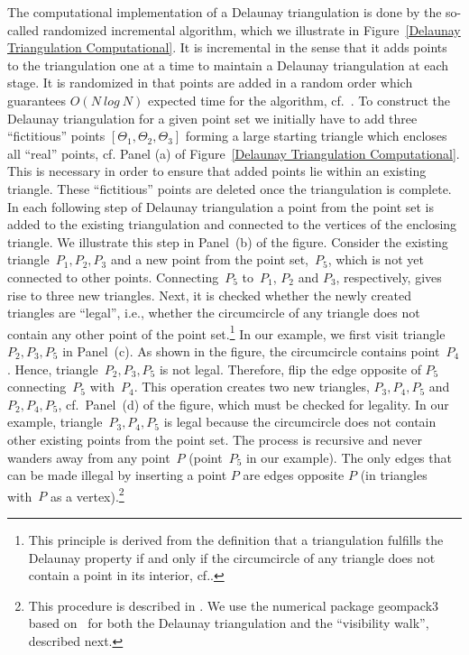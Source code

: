\documentclass[a4paper,12pt]{article}%
\begin{document}
The computational implementation of a Delaunay triangulation is done by the so-called randomized incremental algorithm, which we illustrate in Figure~\ref{Delaunay Triangulation Computational}. It is incremental in the sense that it adds points to the triangulation one at a time to maintain a Delaunay triangulation at each stage. It is randomized in that points are added in a random order which guarantees $O(N~log~N)$ expected time for the algorithm, cf.~. To construct the Delaunay triangulation for a given point set we initially have to add three ``fictitious'' points $\left[  \Theta_{1},\Theta_{2},\Theta_{3}\right]  $ forming a large starting triangle which encloses all ``real'' points, cf. Panel (a) of Figure~\ref{Delaunay Triangulation Computational}. This is necessary in order to ensure that added points lie within an existing triangle. These ``fictitious'' points are deleted once the triangulation is complete. In each following step of Delaunay triangulation a point from the point set is added to the existing triangulation and connected to the vertices of the enclosing triangle. We illustrate this step in Panel~(b) of the figure. Consider the existing triangle~$P_{1},P_{2},P_{3}$ and a new point from the point set,~$P_{5}$, which is not yet connected to other points. Connecting~$P_{5}$ to~$P_{1}$, $P_{2}$ and $P_{3}$, respectively, gives rise to three new triangles. Next, it is checked whether the newly created triangles are ``legal'', i.e., whether the circumcircle of any triangle does not contain any other point of the point set.\footnote{This principle is derived from the definition that a triangulation fulfills the Delaunay property if and only if the circumcircle of any triangle does not contain a point in its interior, cf..}
In our example, we first visit triangle~$P_{2},P_{3},P_{5}$ in Panel~(c). As shown in the figure, the circumcircle contains point~$P_{4}$. Hence, triangle~$P_{2},P_{3},P_{5}$ is not legal. Therefore, flip the edge opposite of $P_{5}$ connecting~$P_{5}$ with~$P_{4}$. This operation creates two new triangles, $P_{3},P_{4},P_{5}$ and~$P_{2},P_{4},P_{5}$, cf.~Panel~(d) of the figure, which must be checked for legality. In our example, triangle~$P_{3},P_{4},P_{5}$ is legal because the circumcircle does not contain other existing points from the point set. The process is recursive and never wanders away from any point~$P$ (point~$P_{5}$ in our example). The only edges that can be made illegal by inserting a point $P$ are edges opposite $P$ (in triangles with~$P$ as a vertex).\footnote{This procedure is described in . We use the numerical package geompack3 based on~ for both the Delaunay triangulation and the ``visibility walk'', described next.}
\end{document}
